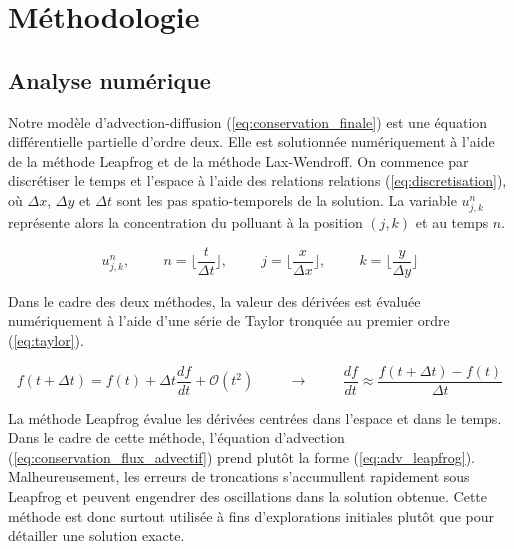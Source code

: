 \documentclass{article}
\begin{document}
\section{Méthodologie}

\subsection{Analyse numérique}\label{sec:model_numerique}

Notre modèle d'advection-diffusion (\ref{eq:conservation_finale}) est une équation différentielle partielle d'ordre deux. Elle est solutionnée numériquement à l'aide de la méthode Leapfrog et de la méthode Lax-Wendroff. On commence par
discrétiser le temps et l'espace à l'aide des relations relations (\ref{eq:discretisation}), où $\Delta x$,  $\Delta y$ et $\Delta t$ sont les pas spatio-temporels de la solution. La variable $u_{j, k}^n$ représente alors la concentration du polluant à la position $(j, k)$ et au temps $n$.

\begin{equation}\label{eq:discretisation}
u_{j, k}^n, 
\hspace{1cm} n = \lfloor{\frac{t}{\Delta t}}\rfloor,
\hspace{1cm} j = \lfloor\frac{x}{\Delta x}\rfloor,
\hspace{1cm} k = \lfloor\frac{y}{\Delta y}\rfloor
\end{equation}

Dans le cadre des deux méthodes, la valeur des dérivées est évaluée numériquement à l'aide d'une série de Taylor tronquée au premier ordre (\ref{eq:taylor}).

\begin{equation}\label{eq:taylor}
f(t+ \Delta t) = f(t) + \Delta t \frac{df}{dt} + \mathcal{O}(t^2) \hspace{1cm} \longrightarrow \hspace{1cm} \frac{df}{dt} \approx \frac{f(t + \Delta t) - f(t)}{\Delta t}
\end{equation}

La méthode Leapfrog évalue les dérivées centrées dans l'espace et dans le temps. Dans le cadre de cette méthode, l'équation d'advection (\ref{eq:conservation_flux_advectif}) prend plutôt la forme (\ref{eq:adv_leapfrog}). Malheureusement, les erreurs de troncations s'accumullent rapidement sous Leapfrog et peuvent engendrer des oscillations dans la solution obtenue. Cette méthode est donc surtout utilisée à fins d'explorations initiales plutôt que pour détailler une solution exacte.
\end{document}
